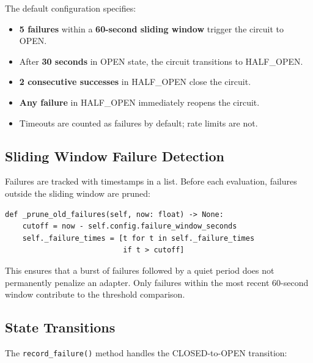 \documentclass[11pt,a4paper]{article}
\theoremstyle{plain}
\theoremstyle{definition}
\begin{document}
The default configuration specifies:
\begin{itemize}[leftmargin=2em]
\item \textbf{5 failures} within a \textbf{60-second sliding window} trigger
  the circuit to OPEN.
\item After \textbf{30 seconds} in OPEN state, the circuit transitions to
  HALF\_OPEN.
\item \textbf{2 consecutive successes} in HALF\_OPEN close the circuit.
\item \textbf{Any failure} in HALF\_OPEN immediately reopens the circuit.
\item Timeouts are counted as failures by default; rate limits are not.
\end{itemize}

\subsection{Sliding Window Failure Detection}

Failures are tracked with timestamps in a list. Before each evaluation, failures
outside the sliding window are pruned:

\begin{lstlisting}[style=pythonstyle, caption={Sliding window pruning from \texttt{circuit\_breaker.py}}]
def _prune_old_failures(self, now: float) -> None:
    cutoff = now - self.config.failure_window_seconds
    self._failure_times = [t for t in self._failure_times
                           if t > cutoff]
\end{lstlisting}

This ensures that a burst of failures followed by a quiet period does not
permanently penalize an adapter. Only failures within the most recent 60-second
window contribute to the threshold comparison.

\subsection{State Transitions}

The \texttt{record\_failure()} method handles the CLOSED-to-OPEN transition:
\end{document}
